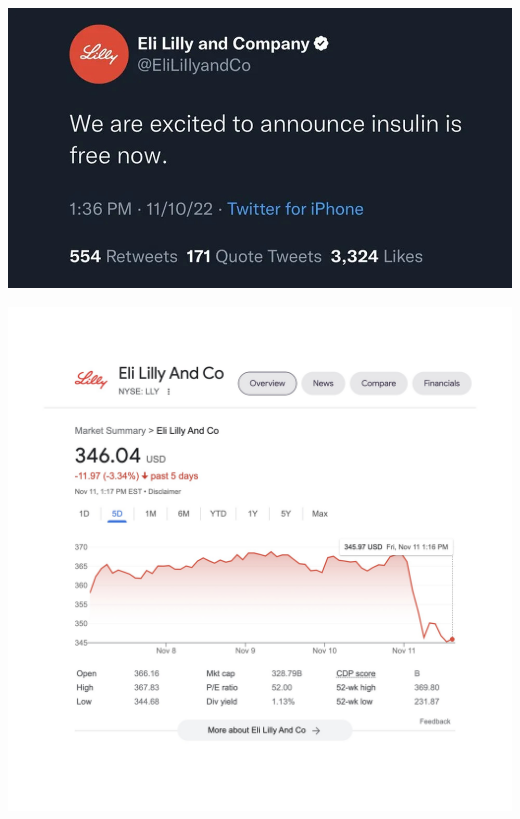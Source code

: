 \documentclass{beamer}
\begin{document}
\begin{frame}
	\includegraphics[width = \textwidth]{free-insulin}
\end{frame}

\begin{frame}
	\includegraphics[width = \textwidth]{eli-lilly-stock}
\end{frame}
\end{document}
